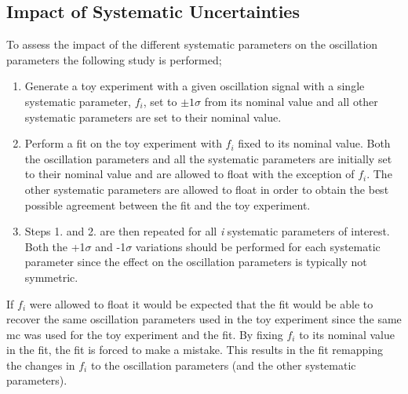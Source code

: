 \clearpage
\subsection{Impact of Systematic Uncertainties}\label{sec:star_plot_study}


To assess the impact of the different systematic parameters on the oscillation parameters the following study is performed;
\begin{enumerate}
    \item Generate a toy experiment with a given oscillation signal with a single systematic parameter, $f_i$, set to $\pm1\sigma$ from its nominal value and all other systematic parameters are set to their nominal value.
    \item Perform a fit on the toy experiment with $f_i$ fixed to its nominal value. Both the oscillation parameters and all the systematic parameters are initially set to their nominal value and are allowed to float with the exception of $f_i$. The other systematic parameters are allowed to float in order to obtain the best possible agreement between the fit and the toy experiment.
    \item Steps 1. and 2. are then repeated for all \textit{i} systematic parameters of interest. Both the +1$\sigma$ and -1$\sigma$ variations should be performed for each systematic parameter since the effect on the oscillation parameters is typically not symmetric.  
\end{enumerate}
If $f_i$ were allowed to float it would be expected that the fit would be able to recover the same oscillation parameters used in the toy experiment since the same \gls{mc} was used for the toy experiment and the fit. By fixing $f_i$ to its nominal value in the fit, the fit is forced to make a mistake. This results in the fit remapping the changes in $f_i$ to the oscillation parameters (and the other systematic parameters). 

